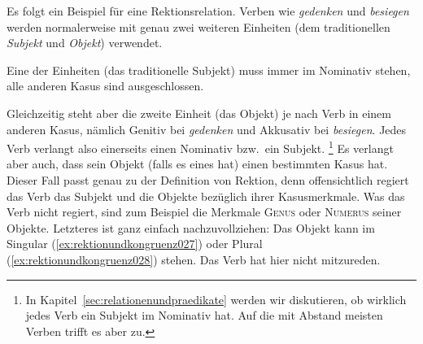 
Es folgt ein Beispiel für eine Rektionsrelation.
Verben wie \textit{gedenken} und \textit{besiegen} werden normalerweise mit genau zwei weiteren Einheiten (dem traditionellen \textit{Subjekt} und \textit{Objekt}) verwendet.

\begin{exe}
\end{exe}

Eine der Einheiten (das traditionelle Subjekt) muss immer im Nominativ stehen, alle anderen Kasus sind ausgeschlossen.

\begin{exe}
  \ex
  \begin{xlist}
  \end{xlist}
\end{exe}

Gleichzeitig steht aber die zweite Einheit (das Objekt) je nach Verb in einem anderen Kasus, nämlich Genitiv bei \textit{gedenken} und Akkusativ bei \textit{besiegen}.
Jedes Verb verlangt also einerseits einen Nominativ bzw.\ ein Subjekt.%
\footnote{In Kapitel~\ref{sec:relationenundpraedikate} werden wir diskutieren, ob wirklich jedes Verb ein Subjekt im Nominativ hat.
Auf die mit Abstand meisten Verben trifft es aber zu.}
Es verlangt aber auch, dass sein Objekt (falls es eines hat) einen bestimmten Kasus hat.
Dieser Fall passt genau zu der Definition von Rektion, denn offensichtlich regiert das Verb das Subjekt und die Objekte bezüglich ihrer Kasusmerkmale.
Was das Verb nicht regiert, sind zum Beispiel die Merkmale \textsc{Genus} oder \textsc{Numerus} seiner Objekte.
Letzteres ist ganz einfach nachzuvollziehen:
Das Objekt kann im Singular (\ref{ex:rektionundkongruenz027}) oder Plural (\ref{ex:rektionundkongruenz028}) stehen.
Das Verb hat hier nicht mitzureden.


\begin{exe}
  \ex
  \begin{xlist}
  \end{xlist}
\end{exe}

